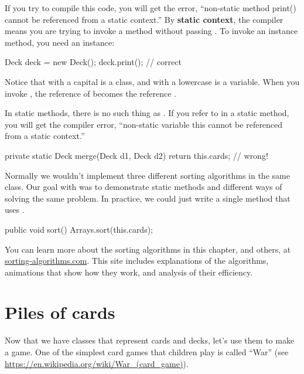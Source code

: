 
If you try to compile this code, you will get the error, ``non-static method print() cannot be referenced from a static context.''
By {\bf static context}, the compiler means you are trying to invoke a method without passing .
To invoke an instance method, you need an instance:

\begin{code}
Deck deck = new Deck();
deck.print();  // correct
\end{code}

Notice that  with a capital  is a class, and  with a lowercase  is a variable.
When you invoke , the reference of  becomes the reference .

In static methods, there is no such thing as .
If you refer to  in a static method, you will get the compiler error, ``non-static variable this cannot be referenced from a static context.''

\begin{code}
private static Deck merge(Deck d1, Deck d2) {
    return this.cards;  // wrong!
}
\end{code}


Normally we wouldn't implement three different sorting algorithms in the same class.
Our goal with  was to demonstrate static methods and different ways of solving the same problem.
In practice, we could just write a single  method that uses .

\begin{code}
public void sort() {
    Arrays.sort(this.cards);
}
\end{code}

You can learn more about the sorting algorithms in this chapter, and others, at \href{http://www.sorting-algorithms.com/}{sorting-algorithms.com}.
This site includes explanations of the algorithms, animations that show how they work, and analysis of their efficiency.


\section{Piles of cards}

Now that we have classes that represent cards and decks, let's use them to make a game.
One of the simplest card games that children play is called ``War'' (see \url{https://en.wikipedia.org/wiki/War_(card_game)}).


